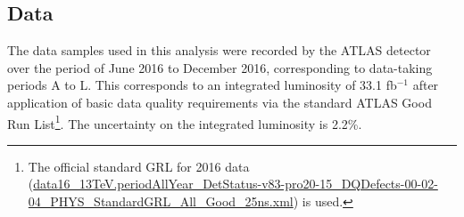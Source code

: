 \subsection{Data}

The data samples used in this analysis were recorded by the ATLAS detector over the period of June 2016 to December 2016, corresponding to data-taking periods A to L. This corresponds to an integrated luminosity of 33.1 fb${}^{-1}$ after application of basic data quality requirements via the standard ATLAS Good Run List\footnote{The official standard GRL for 2016 data (\url{data16_13TeV.periodAllYear_DetStatus-v83-pro20-15_DQDefects-00-02-04_PHYS_StandardGRL_All_Good_25ns.xml}) is used.}. The uncertainty on the integrated luminosity is 2.2\%. 

